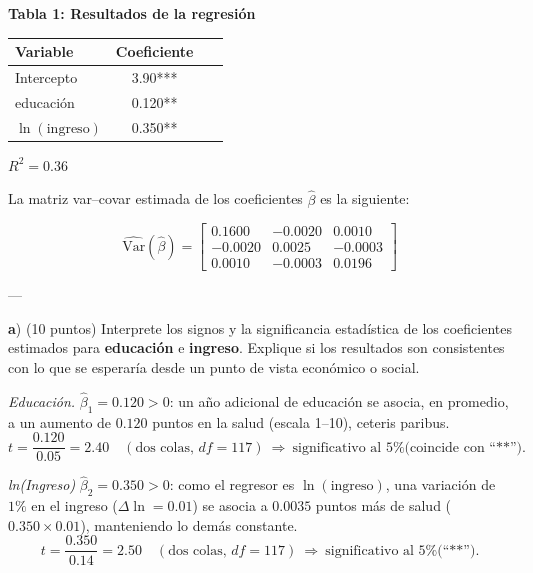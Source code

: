 \documentclass[10pt,a4paper]{article}
\begin{document}
\begin{enumerate}
\noindent
\textbf{Tabla 1: Resultados de la regresión}

\begin{table}[h!]
\centering
\begin{tabular}{lcc}
\toprule
\textbf{Variable} & \textbf{Coeficiente} & \ \\
\midrule
Intercepto         & 3.90***   \\
educación          & 0.120**   \\
$\ln(\mathrm{ingreso})$ & 0.350**  \\
\bottomrule
\end{tabular}
\vspace{0.5em}

\noindent
$R^2 = 0.36$ \\[0.3em]

\end{table}

\noindent
La matriz var–covar estimada de los coeficientes $\hat{\beta}$ es la siguiente:

\[
\widehat{\mathrm{Var}}(\hat{\beta}) =
\begin{bmatrix}
0.1600 & -0.0020 & 0.0010 \\
-0.0020 & 0.0025 & -0.0003 \\
0.0010 & -0.0003 & 0.0196
\end{bmatrix}
\]



---

\begin{flushleft}
\textbf a) (10 puntos) Interprete los signos y la significancia estadística de los coeficientes estimados para \textbf{educación} e \textbf{ingreso}.  
Explique si los resultados son consistentes con lo que se esperaría desde un punto de vista económico o social.

\color{blue}
\bigskip


\emph{Educación.} $\widehat\beta_1=0.120>0$: un año adicional de educación se asocia, en promedio, a un aumento de $0.120$ puntos en la salud (escala 1–10), ceteris paribus. 
\[
t=\frac{0.120}{0.05}=2.40 \quad(\text{dos colas, }df=117)\ \Rightarrow\ \text{significativo al 5\% (coincide con ``**'')}.
\]

\emph{ln(Ingreso)} $\widehat\beta_2=0.350>0$: como el regresor es $\ln(\text{ingreso})$, una variación de $1\%$ en el ingreso ($\Delta\ln=0.01$) se asocia a $0.0035$ puntos más de salud ($0.350\times0.01$), manteniendo lo demás constante.
\[
t=\frac{0.350}{0.14}=2.50 \quad(\text{dos colas, }df=117)\ \Rightarrow\ \text{significativo al 5\% (``**'')}.
\]


\end{flushleft}
\end{enumerate}
\end{document}
